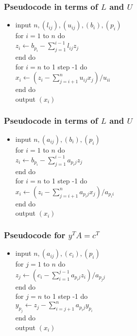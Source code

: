 \documentclass[notheorems,mathserif,table,compress]{beamer}  %
\begin{document}
\begin{frame}
\frametitle{Pseudocode in terms of $L$ and $U$} 
\begin{itemize}
\item 
\textsf{input} $n,(l_{ij}),(u_{ij}),(b_i),(p_i)$\\
\textsf{for} $i=1$ \textsf{to} $n$ \textsf{do}\\
$z_i\leftarrow b_{p_i}-\sum_{j=1}^{i-1}l_{ij}z_j$\\
\textsf{end do}\\
\textsf{for}  $i=n$ \textsf{to} 1 step -1 \textsf{do}\\
$x_i\leftarrow (z_i-\sum_{j=i+1}^n u_{ij}x_j)/u_{ii}$\\
\textsf{end do}\\
\textsf{output} $(x_i)$
\end{itemize}
\end{frame}

\begin{frame}
\frametitle{Pseudocode in terms of $L$ and $U$} 
\begin{itemize}
\item 
\textsf{input} $n,(a_{ij}),(b_i),(p_i)$\\
\textsf{for} $i=1$ \textsf{to} $n$ \textsf{do}\\
$z_i\leftarrow b_{p_i}-\sum_{j=1}^{i-1}a_{p_ij}z_j$\\
\textsf{end do}\\
\textsf{for} $i=n$ \textsf{to} 1 step -1 \textsf{do}\\
$x_i\leftarrow (z_i-\sum_{j=i+1}^n a_{p_ij}x_j)/a_{p_ii}$\\
\textsf{end do}\\
\textsf{output} $(x_i)$
\end{itemize}
\end{frame}

\begin{frame}
\frametitle{Pseudocode for $y^TA=c^T$} 
\begin{itemize}
\item 
\textsf{input} $n,(a_{ij}),(c_i),(p_i)$\\
\textsf{for} $j=1$ \textsf{to} $n$ \textsf{do}\\
$z_j\leftarrow (c_i-\sum_{i=1}^{j-1}a_{p_ij}z_i)/a_{p_jj}$\\
\textsf{end do}\\
\textsf{for} $j=n$ \textsf{to} 1 step -1 \textsf{do}\\
$y_{p_j}\leftarrow z_j-\sum_{i=j+1}^n a_{p_ij}y_{p_i}$\\
\textsf{end do}\\
\textsf{output} $(x_i)$
\end{itemize}
\end{frame}
\end{document}
